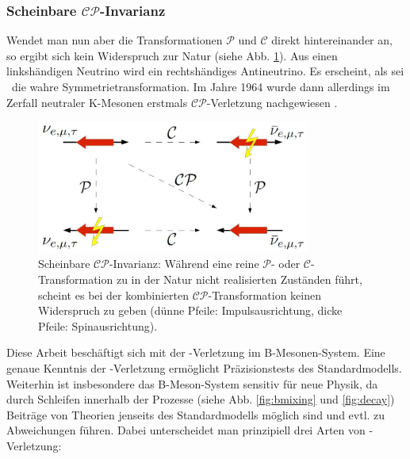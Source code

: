 \subsubsection{Scheinbare \boldmath$\mathcal{CP}$\unboldmath-Invarianz}
Wendet man nun aber die Transformationen $\mathcal{P}$ und $\mathcal{C}$ direkt hintereinander an, so ergibt sich kein Widerspruch zur Natur (siehe Abb. \ref{fig:cp_invarianz}). Aus einen linkshändigen Neutrino wird ein rechtshändiges Antineutrino. Es erscheint, als sei \CP\ die wahre Symmetrietransformation. Im Jahre 1964 wurde dann allerdings im Zerfall neutraler K-Mesonen erstmals $\mathcal{CP}$-Verletzung nachgewiesen \cite{kleinknecht}.
\begin{figure}[hptb]
\centering
\includegraphics[width = 0.8\textwidth]{cp_invarianz}
\caption{Scheinbare $\mathcal{CP}$-Invarianz: Während eine reine $\mathcal{P}$- oder $\mathcal{C}$-Transformation zu in der Natur nicht realisierten Zuständen führt, scheint es bei der kombinierten $\mathcal{CP}$-Transformation keinen Widerspruch zu geben (dünne Pfeile: Impulsausrichtung, dicke Pfeile: Spinausrichtung).}
\label{fig:cp_invarianz}
\end{figure}
Diese Arbeit beschäftigt sich mit der \CP-Verletzung im B-Mesonen-System. Eine genaue Kenntnis der \CP-Verletzung ermöglicht Präzisionstests des Standardmodells. Weiterhin ist insbesondere das B-Meson-System sensitiv für \glqq neue Physik\grqq, da durch Schleifen innerhalb der Prozesse (siehe Abb. \ref{fig:bmixing} und \ref{fig:decay}) Beiträge von Theorien jenseits des Standardmodells möglich sind und evtl. zu Abweichungen führen. Dabei unterscheidet man prinzipiell drei Arten von \CP-Verletzung:
